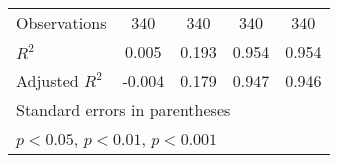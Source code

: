 {\begin{tabular}{l*{4}{c}}
\hline
Observations        &         340         &         340         &         340         &         340         \\
\(R^{2}\)           &       0.005         &       0.193         &       0.954         &       0.954         \\
Adjusted \(R^{2}\)  &      -0.004         &       0.179         &       0.947         &       0.946         \\
\hline\hline
\multicolumn{5}{l}{\footnotesize Standard errors in parentheses}\\
\multicolumn{5}{l}{\footnotesize \sym{*} \(p<0.05\), \sym{**} \(p<0.01\), \sym{***} \(p<0.001\)}\\
\end{tabular}
}
